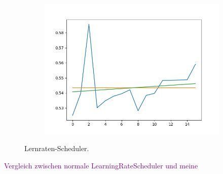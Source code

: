 \documentclass[12pt,a4paper]{scrartcl}
\numberwithin{equation}{section}
\begin{document}
\begin{figure}[h]
\begin{subfigure}{.3\textwidth}
		\includegraphics[width=\textwidth]{lr_schedu_Falsch}
	\end{subfigure}
	\caption{Lernraten-Scheduler.}
	\label{fig:Lernrate_scheduler}
\end{figure}

\textcolor{purple}{Vergleich zwischen normale LearningRateScheduler und meine}
\end{document}
